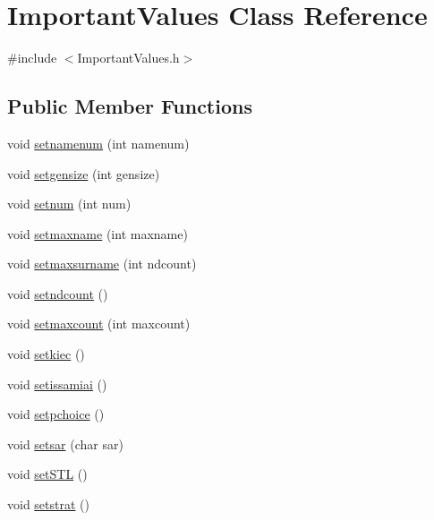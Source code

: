 \hypertarget{class_important_values}{}\section{Important\+Values Class Reference}
\label{class_important_values}


{\ttfamily \#include $<$Important\+Values.\+h$>$}

\subsection*{Public Member Functions}
\begin{DoxyCompactItemize}
\item 
void \mbox{\hyperlink{class_important_values_a6404f08c470c516cfe8f12a53f6fdfa0}{setnamenum}} (int namenum)
\item 
void \mbox{\hyperlink{class_important_values_a4697af2ed71df9b891203f076c88b175}{setgensize}} (int gensize)
\item 
void \mbox{\hyperlink{class_important_values_aa3287d6b468777bfd1187d055a9b6b4b}{setnum}} (int num)
\item 
void \mbox{\hyperlink{class_important_values_a7fc89b5ca74647ae2a9eb473be9cacb8}{setmaxname}} (int maxname)
\item 
void \mbox{\hyperlink{class_important_values_a7e84808462093871d26e11da6b97e738}{setmaxsurname}} (int ndcount)
\item 
void \mbox{\hyperlink{class_important_values_aedfcf997adbff4e5ba00bc298f4116c7}{setndcount}} ()
\item 
void \mbox{\hyperlink{class_important_values_a853329758c5544b28980c67e0ba40471}{setmaxcount}} (int maxcount)
\item 
void \mbox{\hyperlink{class_important_values_ab4fa63cacb5b8c7e1aef75beb0171a5d}{setkiec}} ()
\item 
void \mbox{\hyperlink{class_important_values_afe124ab285a17f87b0de25df6b678df8}{setissamiai}} ()
\item 
void \mbox{\hyperlink{class_important_values_a7a5bffe34d157ddf69b5b7c790d02484}{setpchoice}} ()
\item 
void \mbox{\hyperlink{class_important_values_a66a69ca38f1d648f869d18fb38852bb3}{setsar}} (char sar)
\item 
void \mbox{\hyperlink{class_important_values_ad594e3c77f820a923fa15885c72686b4}{set\+S\+TL}} ()
\item 
void \mbox{\hyperlink{class_important_values_a9ab79e75377ddf1031c53803ed48fcbe}{setstrat}} ()

\end{DoxyCompactItemize}
